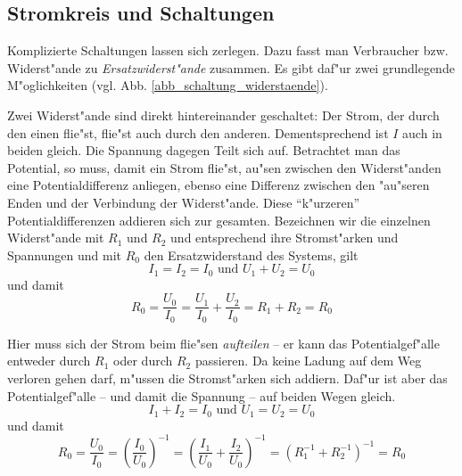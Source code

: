 \subsection{Stromkreis und Schaltungen}
\label{kap_stromkreis-und-schaltungen}

Komplizierte Schaltungen lassen sich zerlegen. Dazu fasst man
Verbraucher bzw. Widerst"ande zu
\emph{Ersatzwiderst"ande} zusammen. Es gibt
daf"ur zwei grundlegende M"oglichkeiten
(vgl. Abb. \ref{abb_schaltung_widerstaende}).
\begin{description}[\setlabelstyle{\bfseries\slshape}]
\item[Serienschaltung] Zwei Widerst"ande sind direkt hintereinander
   geschaltet: Der Strom, der durch den einen flie"st, flie"st auch
   durch den anderen. Dementsprechend ist $I$ auch in beiden
   gleich. Die Spannung dagegen Teilt sich auf. Betrachtet man das
   Potential, so muss, damit ein Strom flie"st, au"sen zwischen den
   Widerst"anden eine Potentialdifferenz anliegen, ebenso eine
   Differenz zwischen den "au"seren Enden und der Verbindung der
   Widerst"ande. Diese "`k"urzeren"' Potentialdifferenzen addieren sich
   zur gesamten. Bezeichnen wir die einzelnen Widerst"ande mit $R_1$
   und $R_2$ und entsprechend ihre Stromst"arken und Spannungen und mit
   $R_0$ den Ersatzwiderstand des Systems, gilt
   \begin{equation}
      \label{eqn_strom,spannung_reihe}
      I_1 = I_2 = I_0 \text{ und } U_1 + U_2 = U_0
   \end{equation}
   und damit
   \begin{equation}
      \label{eqn_widerstand_reihe}
      R_0 = \frac{U_0}{I_0} = \frac{U_1}{I_0} + \frac{U_2}{I_0} =
      \boxed { R_1 + R_2 = R_0 }
   \end{equation}
\item[Parallelschaltung] Hier muss sich der Strom beim flie"sen
   \emph{aufteilen} -- er kann das Potentialgef"alle entweder durch
   $R_1$ oder durch $R_2$ passieren. Da keine Ladung auf dem Weg
   verloren gehen darf, m"ussen die Stromst"arken sich addiern. Daf"ur
   ist aber das Potentialgef"alle -- und damit die Spannung -- auf
   beiden Wegen gleich.
   \begin{equation}
      \label{eqn_differenz-c76}
      I_1 + I_2 = I_0 \text{ und } U_1 = U_2 = U_0
   \end{equation}
   und damit
   \begin{equation}
      \label{eqn_differenz-c77}
      R_0 = \frac{U_0}{I_0} = \left ( \frac{I_0}{U_0} \right )^{-1} =
 \left ( \frac{I_1}{U_0} +  \frac{I_2}{U_0} \right )^{-1} =
\boxed{  \left ( R_1^{-1} + R_2^{-1} \right )^{-1} = R_0 }
   \end{equation}
\end{description}

